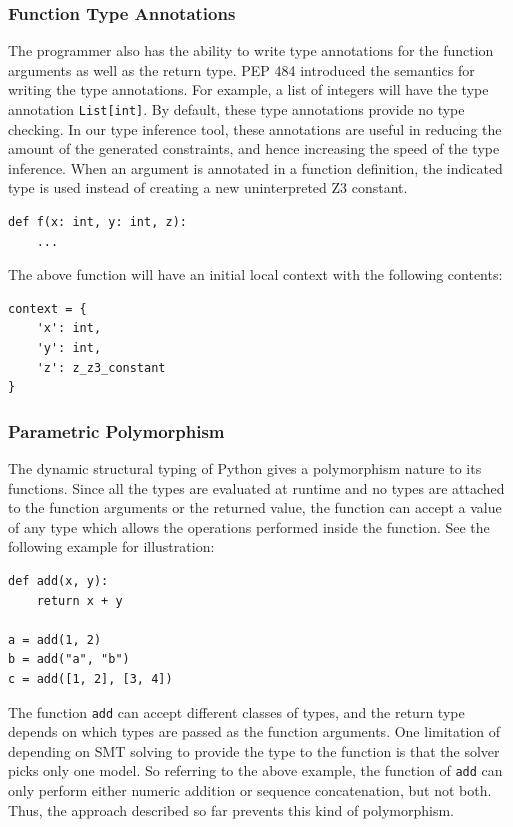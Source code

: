 \subsubsection{Function Type Annotations}
The programmer also has the ability to write type annotations for the function arguments as well as the return type. PEP 484 \cite{484} introduced the semantics for writing the type annotations. For example, a list of integers will have the type annotation \lstinline|List[int]|. By default, these type annotations provide no type checking. In our type inference tool, these annotations are useful in reducing the amount of the generated constraints, and hence increasing the speed of the type inference. When an argument is annotated in a function definition, the indicated type is used instead of creating a new uninterpreted Z3 constant.
\begin{lstlisting}
def f(x: int, y: int, z):
	...
\end{lstlisting}

The above function will have an initial local context with the following contents:
\begin{lstlisting}
context = {
	'x': int,
	'y': int,
	'z': z_z3_constant
}
\end{lstlisting}

\subsubsection{Parametric Polymorphism}
The dynamic structural typing of Python gives a polymorphism nature to its functions. Since all the types are evaluated at runtime and no types are attached to the function arguments or the returned value, the function can accept a value of any type which allows the operations performed inside the function. See the following example for illustration:
\begin{lstlisting}
def add(x, y):
	return x + y
	
a = add(1, 2)
b = add("a", "b")
c = add([1, 2], [3, 4])
\end{lstlisting}

The function \lstinline|add| can accept different classes of types, and the return type depends on which types are passed as the function arguments. One limitation of depending on SMT solving to provide the type to the function is that the solver picks only one model. So referring to the above example, the function of \lstinline|add| can only perform either numeric addition or sequence concatenation, but not both. Thus, the approach described so far prevents this kind of polymorphism.

